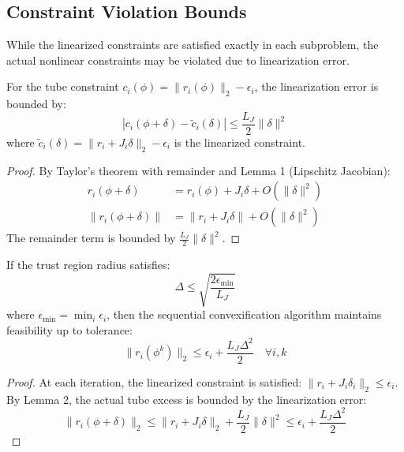 \subsection{Constraint Violation Bounds}

While the linearized constraints are satisfied exactly in each subproblem, the actual nonlinear constraints may be violated due to linearization error.

\begin{lemma}
For the tube constraint $c_i(\phi) = \|r_i(\phi)\|_2 - \epsilon_i$, the linearization error is bounded by:
\begin{equation}
|c_i(\phi + \delta) - \tilde{c}_i(\delta)| \leq \frac{L_J}{2} \|\delta\|^2
\end{equation}
where $\tilde{c}_i(\delta) = \|r_i + J_i \delta\|_2 - \epsilon_i$ is the linearized constraint.
\end{lemma}

\begin{proof}
By Taylor's theorem with remainder and Lemma 1 (Lipschitz Jacobian):
\begin{align}
r_i(\phi + \delta) &= r_i(\phi) + J_i \delta + O(\|\delta\|^2) \\
\|r_i(\phi + \delta)\| &= \|r_i + J_i \delta\| + O(\|\delta\|^2)
\end{align}
The remainder term is bounded by $\frac{L_J}{2}\|\delta\|^2$.
\end{proof}

\begin{theorem}
If the trust region radius satisfies:
\begin{equation}
\Delta \leq \sqrt{\frac{2\epsilon_{\min}}{L_J}}
\end{equation}
where $\epsilon_{\min} = \min_i \epsilon_i$, then the sequential convexification algorithm maintains feasibility up to tolerance:
\begin{equation}
\|r_i(\phi^k)\|_2 \leq \epsilon_i + \frac{L_J \Delta^2}{2} \quad \forall i, k
\end{equation}
\end{theorem}

\begin{proof}
At each iteration, the linearized constraint is satisfied: $\|r_i + J_i \delta_i\|_2 \leq \epsilon_i$.
By Lemma 2, the actual tube excess is bounded by the linearization error:
\begin{equation}
\|r_i(\phi + \delta)\|_2 \leq \|r_i + J_i \delta\|_2 + \frac{L_J}{2}\|\delta\|^2 \leq \epsilon_i + \frac{L_J \Delta^2}{2}
\end{equation}
\end{proof}

